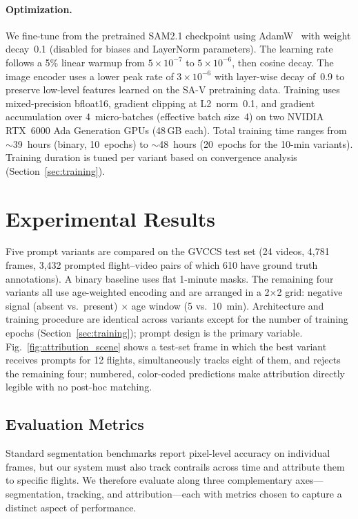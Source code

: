 \documentclass[review]{elsarticle}
\begin{document}
\paragraph{Optimization.} We fine-tune from the pretrained SAM2.1 checkpoint using AdamW~\cite{loshchilov2019adamw} with weight decay~0.1 (disabled for biases and LayerNorm parameters). The learning rate follows a 5\% linear warmup from $5 \times 10^{-7}$ to $5 \times 10^{-6}$, then cosine decay. The image encoder uses a lower peak rate of $3 \times 10^{-6}$ with layer-wise decay of~0.9 to preserve low-level features learned on the SA-V pretraining data. Training uses mixed-precision bfloat16, gradient clipping at L2~norm~0.1, and gradient accumulation over 4~micro-batches (effective batch size~4) on two NVIDIA RTX~6000 Ada Generation GPUs (48\,GB each). Total training time ranges from $\sim$39~hours (binary, 10~epochs) to $\sim$48~hours (20~epochs for the 10-min variants). Training duration is tuned per variant based on convergence analysis (Section~\ref{sec:training}).

\section{Experimental Results}
\label{sec:results}

Five prompt variants are compared on the GVCCS test set (24 videos, 4,781 frames, 3,432 prompted flight--video pairs of which 610 have ground truth annotations). A binary baseline uses flat 1-minute masks. The remaining four variants all use age-weighted encoding and are arranged in a 2$\times$2 grid: negative signal (absent vs.\ present) $\times$ age window (5 vs.\ 10~min). Architecture and training procedure are identical across variants except for the number of training epochs (Section~\ref{sec:training}); prompt design is the primary variable. Fig.~\ref{fig:attribution_scene} shows a test-set frame in which the best variant receives prompts for 12 flights, simultaneously tracks eight of them, and rejects the remaining four; numbered, color-coded predictions make attribution directly legible with no post-hoc matching.

\subsection{Evaluation Metrics}
\label{sec:metrics}

Standard segmentation benchmarks report pixel-level accuracy on individual frames, but our system must also track contrails across time and attribute them to specific flights. We therefore evaluate along three complementary axes---segmentation, tracking, and attribution---each with metrics chosen to capture a distinct aspect of performance.
\end{document}
